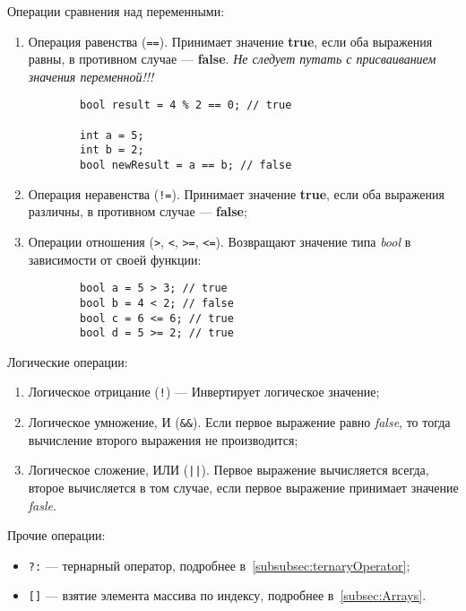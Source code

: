 Операции сравнения над переменными:
\begin{enumerate}
    \item Операция равенства (\lstinline{==}). Принимает значение \textbf{true}, если оба выражения равны, в противном случае --- \textbf{false}. \textit{Не следует путать с присваиванием значения переменной!!!}

    \begin{lstlisting}
        bool result = 4 % 2 == 0; // true

        int a = 5;
        int b = 2;
        bool newResult = a == b; // false
    \end{lstlisting}

    \item Операция неравенства (\lstinline{!=}). Принимает значение \textbf{true}, если оба выражения различны, в противном случае --- \textbf{false};
    \item Операции отношения (\lstinline{>}, \lstinline{<}, \lstinline{>=}, \lstinline{<=}). Возвращают значение типа \textit{bool} в зависимости от своей функции:

    \begin{lstlisting}
        bool a = 5 > 3; // true
        bool b = 4 < 2; // false
        bool c = 6 <= 6; // true
        bool d = 5 >= 2; // true
    \end{lstlisting}
\end{enumerate}

Логические операции:

\begin{enumerate}
    \item Логическое отрицание (\lstinline{!}) --- Инвертирует логическое значение;
    \item Логическое умножение, И (\lstinline{&&}). Если первое выражение равно \textit{false}, то тогда вычисление второго выражения не производится;
    \item Логическое сложение, ИЛИ (\lstinline{||}). Первое выражение вычисляется всегда, второе вычисляется в том случае, если первое выражение принимает значение \textit{fasle}.
\end{enumerate}

Прочие операции:
\begin{itemize}
    \item \lstinline{?:} --- тернарный оператор, подробнее в~\ref{subsubsec:ternaryOperator};
    \item \lstinline{[]} --- взятие элемента массива по индексу, подробнее в~\ref{subsec:Arrays}.
\end{itemize}

